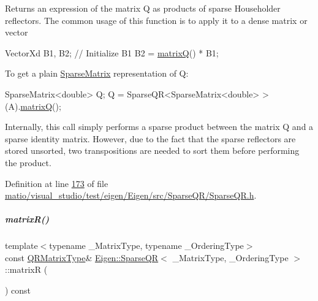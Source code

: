 \begin{DoxyReturn}{Returns}
an expression of the matrix Q as products of sparse Householder reflectors. The common usage of this function is to apply it to a dense matrix or vector 
\begin{DoxyCode}
VectorXd B1, B2;
\textcolor{comment}{// Initialize B1}
B2 = \hyperlink{group___sparse_q_r___module_ae1cc0a836c177d4f42600f8639354be1}{matrixQ}() * B1;
\end{DoxyCode}

\end{DoxyReturn}
To get a plain \hyperlink{group___sparse_core___module_class_eigen_1_1_sparse_matrix}{Sparse\+Matrix} representation of Q\+: 
\begin{DoxyCode}
SparseMatrix<double> Q;
Q = SparseQR<SparseMatrix<double> >(A).\hyperlink{group___sparse_q_r___module_ae1cc0a836c177d4f42600f8639354be1}{matrixQ}();
\end{DoxyCode}
 Internally, this call simply performs a sparse product between the matrix Q and a sparse identity matrix. However, due to the fact that the sparse reflectors are stored unsorted, two transpositions are needed to sort them before performing the product. 

Definition at line \hyperlink{matio_2visual__studio_2test_2eigen_2_eigen_2src_2_sparse_q_r_2_sparse_q_r_8h_source_l00173}{173} of file \hyperlink{matio_2visual__studio_2test_2eigen_2_eigen_2src_2_sparse_q_r_2_sparse_q_r_8h_source}{matio/visual\+\_\+studio/test/eigen/\+Eigen/src/\+Sparse\+Q\+R/\+Sparse\+Q\+R.\+h}.

\mbox{\label{group___sparse_q_r___module_a564524ff13b2b6dd1e76127404f7b920}} 
\subparagraph{\texorpdfstring{matrix\+R()}{matrixR()}\hspace{0.1cm}{\footnotesize\ttfamily [1/2]}}
{\footnotesize\ttfamily template$<$typename \+\_\+\+Matrix\+Type, typename \+\_\+\+Ordering\+Type$>$ \\
const \hyperlink{group___sparse_core___module}{Q\+R\+Matrix\+Type}\& \hyperlink{group___sparse_q_r___module_class_eigen_1_1_sparse_q_r}{Eigen\+::\+Sparse\+QR}$<$ \+\_\+\+Matrix\+Type, \+\_\+\+Ordering\+Type $>$\+::matrixR (\begin{DoxyParamCaption}{ }\end{DoxyParamCaption}) const\hspace{0.3cm}{\ttfamily [inline]}}

